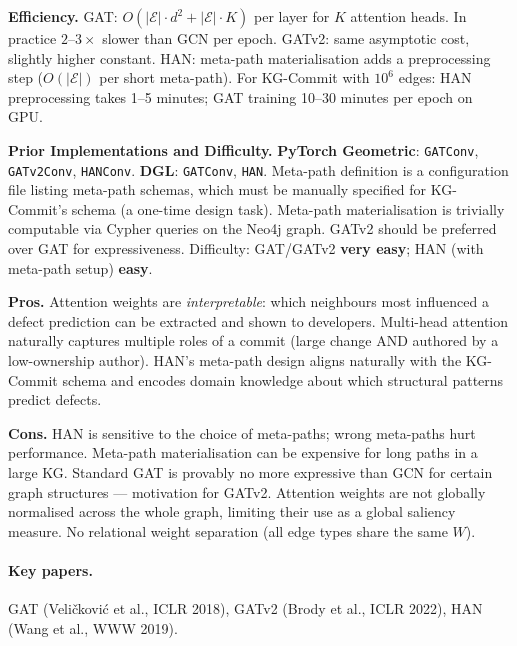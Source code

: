 \documentclass[12pt,a4paper]{article}
\begin{document}
\begin{effbox}
\textbf{Efficiency.}
GAT: $O(|\mathcal{E}| \cdot d^2 + |\mathcal{E}| \cdot K)$ per layer for $K$
attention heads. In practice $2$--$3\times$ slower than GCN per epoch.
GATv2: same asymptotic cost, slightly higher constant.
HAN: meta-path materialisation adds a preprocessing step ($O(|\mathcal{E}|)$
per short meta-path). For KG-Commit with $10^6$ edges: HAN preprocessing takes
1--5 minutes; GAT training 10--30 minutes per epoch on GPU.
\end{effbox}

\begin{implbox}
\textbf{Prior Implementations and Difficulty.}
\textbf{PyTorch Geometric}: \texttt{GATConv}, \texttt{GATv2Conv},
\texttt{HANConv}. \textbf{DGL}: \texttt{GATConv}, \texttt{HAN}.
Meta-path definition is a configuration file listing meta-path schemas,
which must be manually specified for KG-Commit's schema (a one-time design
task). Meta-path materialisation is trivially computable via Cypher queries
on the Neo4j graph. GATv2 should be preferred over GAT for expressiveness.
Difficulty: GAT/GATv2 \textbf{very easy}; HAN (with meta-path setup)
\textbf{easy}.
\end{implbox}

\begin{prosbox}
\textbf{Pros.}
Attention weights are \emph{interpretable}: which neighbours most influenced
a defect prediction can be extracted and shown to developers. Multi-head
attention naturally captures multiple roles of a commit (large change AND
authored by a low-ownership author). HAN's meta-path design aligns naturally
with the KG-Commit schema and encodes domain knowledge about which structural
patterns predict defects.
\end{prosbox}

\begin{consbox}
\textbf{Cons.}
HAN is sensitive to the choice of meta-paths; wrong meta-paths hurt performance.
Meta-path materialisation can be expensive for long paths in a large KG.
Standard GAT is provably no more expressive than GCN for certain graph
structures --- motivation for GATv2. Attention weights are not globally
normalised across the whole graph, limiting their use as a global saliency
measure. No relational weight separation (all edge types share the same $W$).
\end{consbox}

\paragraph{Key papers.} GAT (Veli\v{c}kovi\'{c} et al., ICLR 2018), GATv2
(Brody et al., ICLR 2022), HAN (Wang et al., WWW 2019).
\end{document}
